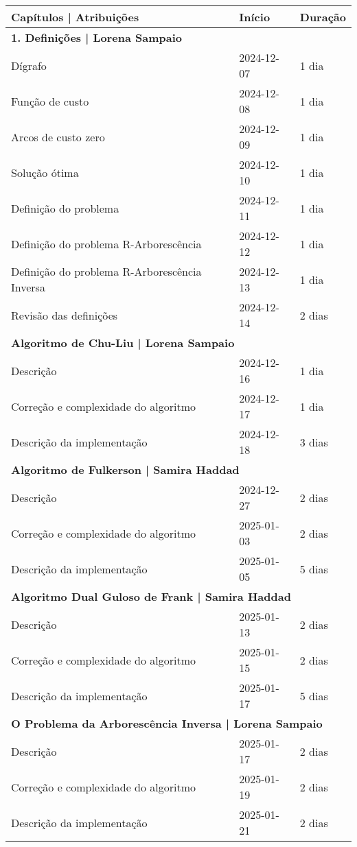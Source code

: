 \documentclass[12pt,a4paper]{article}
\begin{document}
\begin{center}
\begin{tabular}{|l|l|l|}
\hline
\textbf{Capítulos | Atribuições} & \textbf{Início} & \textbf{Duração} \\
\hline
\multicolumn{3}{|l|}{\textbf{1. Definições | Lorena Sampaio}} \\
\hline
Dígrafo & 2024-12-07 & 1 dia \\
Função de custo & 2024-12-08 & 1 dia \\
Arcos de custo zero & 2024-12-09 & 1 dia \\
Solução ótima & 2024-12-10 & 1 dia \\
Definição do problema & 2024-12-11 & 1 dia \\
Definição do problema R-Arborescência & 2024-12-12 & 1 dia \\
Definição do problema R-Arborescência Inversa & 2024-12-13 & 1 dia \\
Revisão das definições & 2024-12-14 & 2 dias \\
\hline
\multicolumn{3}{|l|}{\textbf{Algoritmo de Chu-Liu | Lorena Sampaio}} \\
\hline
Descrição & 2024-12-16 & 1 dia \\
Correção e complexidade do algoritmo & 2024-12-17 & 1 dia \\
Descrição da implementação & 2024-12-18 & 3 dias \\
\hline
\multicolumn{3}{|l|}{\textbf{Algoritmo de Fulkerson | Samira Haddad}} \\
\hline
Descrição & 2024-12-27 & 2 dias \\
Correção e complexidade do algoritmo & 2025-01-03 & 2 dias \\
Descrição da implementação & 2025-01-05 & 5 dias \\
\hline
\multicolumn{3}{|l|}{\textbf{Algoritmo Dual Guloso de Frank | Samira Haddad}} \\
\hline
Descrição & 2025-01-13 & 2 dias \\
Correção e complexidade do algoritmo & 2025-01-15 & 2 dias \\
Descrição da implementação & 2025-01-17 & 5 dias \\
\hline
\multicolumn{3}{|l|}{\textbf{O Problema da Arborescência Inversa | Lorena Sampaio}} \\
\hline
Descrição & 2025-01-17 & 2 dias \\
Correção e complexidade do algoritmo & 2025-01-19 & 2 dias \\
Descrição da implementação & 2025-01-21 & 2 dias \\

\end{tabular}
\end{center}
\end{document}
